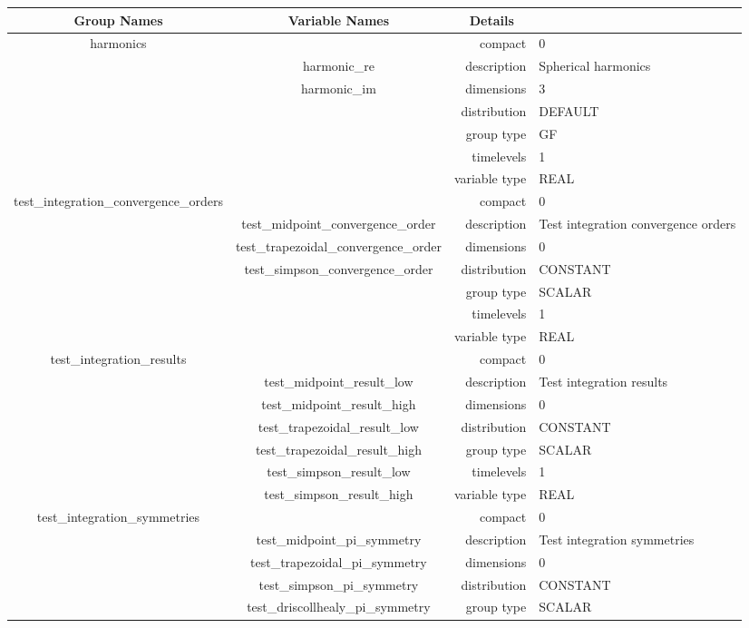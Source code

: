 \documentclass{article}
\begin{document}
\begin{tabular*}{150mm}{|c|c@{\extracolsep{\fill}}|rl|} \hline 
~ {\bf Group Names} ~ & ~ {\bf Variable Names} ~  &{\bf Details} ~ & ~\\ 
\hline 
harmonics &  & compact & 0 \\ 
 & harmonic\_re & description & Spherical harmonics \\ 
 & harmonic\_im & dimensions & 3 \\ 
 &  & distribution & DEFAULT \\ 
 &  & group type & GF \\ 
 &  & timelevels & 1 \\ 
 &  & variable type & REAL \\ 
\hline 
test\_integration\_convergence\_orders &  & compact & 0 \\ 
 & test\_midpoint\_convergence\_order & description & Test integration convergence orders \\ 
 & test\_trapezoidal\_convergence\_order & dimensions & 0 \\ 
 & test\_simpson\_convergence\_order & distribution & CONSTANT \\ 
 &  & group type & SCALAR \\ 
 &  & timelevels & 1 \\ 
 &  & variable type & REAL \\ 
\hline 
test\_integration\_results &  & compact & 0 \\ 
 & test\_midpoint\_result\_low & description & Test integration results \\ 
 & test\_midpoint\_result\_high & dimensions & 0 \\ 
 & test\_trapezoidal\_result\_low & distribution & CONSTANT \\ 
 & test\_trapezoidal\_result\_high & group type & SCALAR \\ 
 & test\_simpson\_result\_low & timelevels & 1 \\ 
 & test\_simpson\_result\_high & variable type & REAL \\ 
\hline 
test\_integration\_symmetries &  & compact & 0 \\ 
 & test\_midpoint\_pi\_symmetry & description & Test integration symmetries \\ 
 & test\_trapezoidal\_pi\_symmetry & dimensions & 0 \\ 
 & test\_simpson\_pi\_symmetry & distribution & CONSTANT \\ 
 & test\_driscollhealy\_pi\_symmetry & group type & SCALAR \\ 

\end{tabular*}
\end{document}
